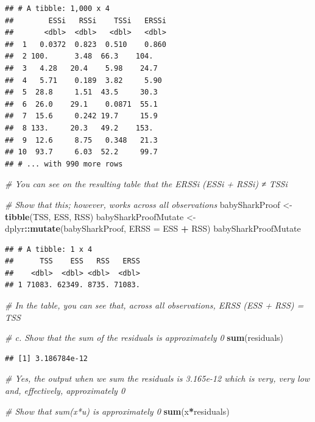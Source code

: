 \documentclass[]{article}
\newenvironment{Shaded}{\begin{snugshade}}{\end{snugshade}}
\newcommand{\KeywordTok}[1]{\textcolor[rgb]{0.13,0.29,0.53}{\textbf{#1}}}
\newcommand{\DataTypeTok}[1]{\textcolor[rgb]{0.13,0.29,0.53}{#1}}
\newcommand{\StringTok}[1]{\textcolor[rgb]{0.31,0.60,0.02}{#1}}
\newcommand{\CommentTok}[1]{\textcolor[rgb]{0.56,0.35,0.01}{\textit{#1}}}
\newcommand{\OperatorTok}[1]{\textcolor[rgb]{0.81,0.36,0.00}{\textbf{#1}}}
\newcommand{\NormalTok}[1]{#1}
\begin{document}
\begin{verbatim}
## # A tibble: 1,000 x 4
##        ESSi   RSSi    TSSi   ERSSi
##       <dbl>  <dbl>   <dbl>   <dbl>
##  1   0.0372  0.823  0.510    0.860
##  2 100.      3.48  66.3    104.   
##  3   4.28   20.4    5.98    24.7  
##  4   5.71    0.189  3.82     5.90 
##  5  28.8     1.51  43.5     30.3  
##  6  26.0    29.1    0.0871  55.1  
##  7  15.6     0.242 19.7     15.9  
##  8 133.     20.3   49.2    153.   
##  9  12.6     8.75   0.348   21.3  
## 10  93.7     6.03  52.2     99.7  
## # ... with 990 more rows
\end{verbatim}

\begin{Shaded}
\begin{Highlighting}[]
\CommentTok{# You can see on the resulting table that the ERSSi (ESSi + RSSi) ≠ TSSi}

\CommentTok{# Show that this; however, works across all observations }
\NormalTok{babySharkProof <-}\StringTok{ }\KeywordTok{tibble}\NormalTok{(TSS, ESS, RSS)}
\NormalTok{babySharkProofMutate <-}\StringTok{ }\NormalTok{dplyr}\OperatorTok{::}\KeywordTok{mutate}\NormalTok{(babySharkProof, }\DataTypeTok{ERSS =}\NormalTok{ ESS }\OperatorTok{+}\StringTok{ }\NormalTok{RSS)}
\NormalTok{babySharkProofMutate}
\end{Highlighting}
\end{Shaded}

\begin{verbatim}
## # A tibble: 1 x 4
##      TSS    ESS   RSS   ERSS
##    <dbl>  <dbl> <dbl>  <dbl>
## 1 71083. 62349. 8735. 71083.
\end{verbatim}

\begin{Shaded}
\begin{Highlighting}[]
\CommentTok{# In the table, you can see that, across all observations, ERSS (ESS + RSS) = TSS }

\CommentTok{# c. Show that the sum of the residuals is approximately 0}
\KeywordTok{sum}\NormalTok{(residuals)}
\end{Highlighting}
\end{Shaded}

\begin{verbatim}
## [1] 3.186784e-12
\end{verbatim}

\begin{Shaded}
\begin{Highlighting}[]
\CommentTok{# Yes, the output when we sum the residuals is 3.165e-12 which is very, very low and, effectively, approximately 0}

\CommentTok{# Show that sum(x*u) is approximately 0 }
\KeywordTok{sum}\NormalTok{(x}\OperatorTok{*}\NormalTok{residuals)}
\end{Highlighting}
\end{Shaded}
\end{document}
